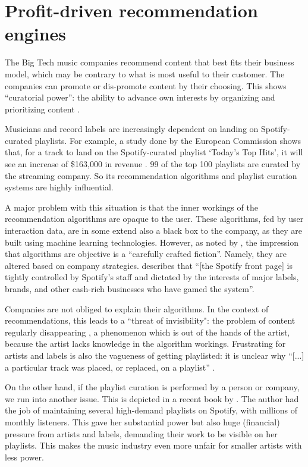 \section{Profit-driven recommendation engines}
\label{sec:problem-description-recommendations}
The Big Tech music companies recommend content that best fits their business model, which may be contrary to what is most useful to their customer. The companies can promote or dis-promote content by their choosing. This shows ``curatorial power'': the ability to advance own interests by organizing and prioritizing content \citep{prey2020locating}.

Musicians and record labels are increasingly dependent on landing on Spotify-curated playlists. For example, a study done by the European Commission shows that, for a track to land on the Spotify-curated playlist `Today's Top Hits', it will see an increase of \$163,000 in revenue \citep{aguiar2018platforms}. 99 of the top 100 playlists are curated by the streaming company. So its recommendation algorithms and playlist curation systems are highly influential. 

A major problem with this situation is that the inner workings of the recommendation algorithms are opaque to the user. These algorithms, fed by user interaction data, are in some extend also a black box to the company, as they are built using machine learning technologies. However, as noted by \cite{gillespie2014relevance}, the impression that algorithms are objective is a ``carefully crafted fiction''. Namely, they are altered based on company strategies. \cite{thebaffler2017} describes that ``[the Spotify front page] is tightly controlled by Spotify’s staff and dictated by the interests of major labels, brands, and other cash-rich businesses who have gamed the system''.

Companies are not obliged to explain their algorithms. In the context of recommendations, this leads to a ``threat of invisibility": the problem of content regularly disappearing \citep{bucher2018if}, a phenomenon which is out of the hands of the artist, because the artist lacks knowledge in the algorithm workings. Frustrating for artists and labels is also the vagueness of getting playlisted: it is unclear why ``[...] a particular track was placed, or replaced, on a playlist'' \citep{prey2020locating}. 

On the other hand, if the playlist curation is performed by a person or company, we run into another issue. This is depicted in a recent book by \cite{heuvelings2020}. The author had the job of maintaining several high-demand playlists on Spotify, with millions of monthly listeners. This gave her substantial power but also huge (financial) pressure from artists and labels, demanding their work to be visible on her playlists. This makes the music industry even more unfair for smaller artists with less power.

